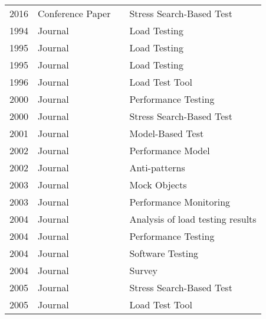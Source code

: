 \begin{longtable}{llll}
2016          & Conference Paper & \cite{Gois2016}                 & Stress Search-Based Test         \\
1994          & Journal          & \cite{Avritzer1994}             & Load Testing                     \\
1995          & Journal          & \cite{Avritzer1995}            & Load Testing                     \\
1995          & Journal          & \cite{Trent1995}                & Load Testing                     \\
1996          & Journal          & \cite{Yang1996}                 & Load Test Tool                   \\
2000          & Journal          & \cite{Weyuker2000}              & Performance Testing              \\
2000          & Journal          & \cite{Gross2000}                & Stress Search-Based Test         \\
2001          & Journal          & \cite{El-far2001}               & Model-Based Test                 \\
2002          & Journal          & \cite{Menasce2002a}             & Performance Model                \\
2002          & Journal          & \cite{Smith2002}                & Anti-patterns                    \\
2003          & Journal          & \cite{Brown2003}                & Mock Objects                     \\
2003          & Journal          & \cite{Aguilera2003}             & Performance Monitoring           \\
2004          & Journal          & \cite{Dumitrescu2004}           & Analysis of load testing results \\
2004          & Journal          & \cite{Barber2004}               & Performance Testing              \\
2004          & Journal          & \cite{Sandler2004}              & Software Testing                 \\
2004          & Journal          & \cite{McMinn2004}               & Survey                           \\
2005          & Journal          & \cite{Briand2005}               & Stress Search-Based Test         \\
2005          & Journal          & \cite{Kiran2015}                & Load Test Tool                   \\

\end{longtable}
